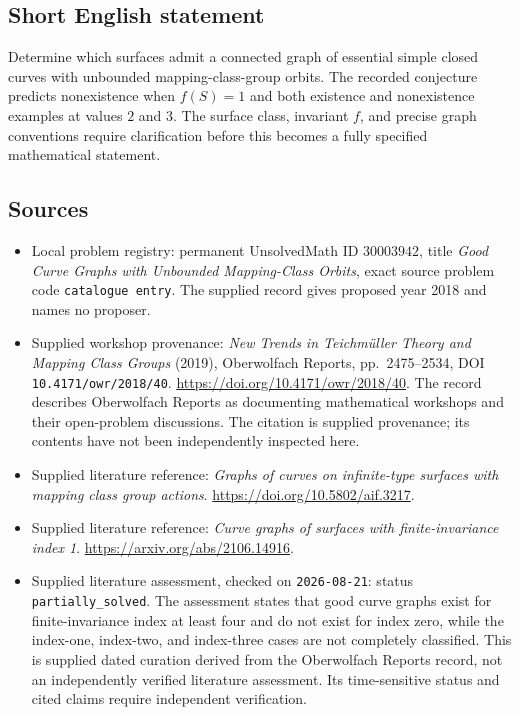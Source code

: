 \documentclass[11pt]{article}
\begin{document}
\subsection{Short English statement}
Determine which surfaces admit a connected graph of essential simple closed curves with unbounded mapping-class-group orbits. The recorded conjecture predicts nonexistence when \(f(S)=1\) and both existence and nonexistence examples at values \(2\) and \(3\). The surface class, invariant \(f\), and precise graph conventions require clarification before this becomes a fully specified mathematical statement.
\subsection{Sources}
\begin{itemize}
\item Local problem registry: permanent UnsolvedMath ID \(30003942\), title \emph{Good Curve Graphs with Unbounded Mapping-Class Orbits}, exact source problem code \texttt{catalogue entry}. The supplied record gives proposed year 2018 and names no proposer.
\item Supplied workshop provenance: \emph{New Trends in Teichm\"uller Theory and Mapping Class Groups} (2019), Oberwolfach Reports, pp.~2475--2534, DOI \texttt{10.4171/owr/2018/40}. \url{https://doi.org/10.4171/owr/2018/40}. The record describes Oberwolfach Reports as documenting mathematical workshops and their open-problem discussions. The citation is supplied provenance; its contents have not been independently inspected here.
\item Supplied literature reference: \emph{Graphs of curves on infinite-type surfaces with mapping class group actions}. \url{https://doi.org/10.5802/aif.3217}.
\item Supplied literature reference: \emph{Curve graphs of surfaces with finite-invariance index 1}. \url{https://arxiv.org/abs/2106.14916}.
\item Supplied literature assessment, checked on \texttt{2026-08-21}: status \texttt{partially\_solved}. The assessment states that good curve graphs exist for finite-invariance index at least four and do not exist for index zero, while the index-one, index-two, and index-three cases are not completely classified. This is supplied dated curation derived from the Oberwolfach Reports record, not an independently verified literature assessment. Its time-sensitive status and cited claims require independent verification.
\end{itemize}
\end{document}
